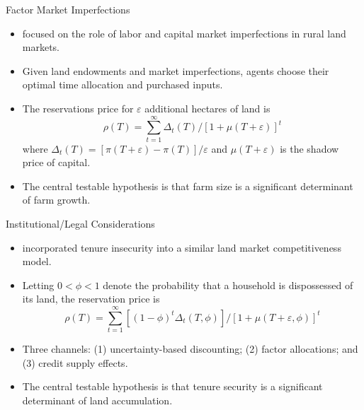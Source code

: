 \documentclass[xcolor=dvipsnames]{beamer}
\begin{document}
\begin{frame}{Factor Market Imperfections}
\begin{itemize}
\item \citet{carter1993} focused on the role of labor and capital market 
imperfections in rural land markets.
\par\pause\noindent \item Given land endowments and market 
imperfections, agents choose their optimal time allocation and purchased 
inputs.
\par\pause\noindent \item The reservations price for $\varepsilon$ 
additional hectares of land is 
\begin{equation*}
\rho(T) = \sum_{t=1}^{\infty} \Delta_t(T)/[1 + \mu(T + \varepsilon)]^t
\end{equation*}
where $\Delta_t(T) = [\pi(T + \varepsilon) - \pi(T)]/\varepsilon $ and 
$\mu(T + \varepsilon)$ is the shadow price of capital.
\par\pause\noindent \item The central testable hypothesis is that farm 
size is a significant determinant of farm growth.
\end{itemize}
\end{frame}

\begin{frame}{Institutional/Legal Considerations}
\begin{itemize}
\item \citet{carter1998} incorporated tenure insecurity into a similar land 
market competitiveness model.
\par\pause\noindent \item Letting $0 < \phi < 1$ denote the probability 
that a household is dispossessed of its land, the reservation price is
\begin{equation*}
\rho(T) = \sum_{t=1}^{\infty} [(1 - \phi)^t \Delta_t(T, \phi)]/
[1 + \mu(T + \varepsilon, \phi)]^t
\end{equation*}
\par\pause\noindent \item Three channels: (1) uncertainty-based 
discounting; (2) factor allocations; and (3) credit supply effects.
\par\pause\noindent \item The central testable hypothesis is that tenure 
security is a significant determinant of land accumulation.
\end{itemize}
\end{frame}
\end{document}

